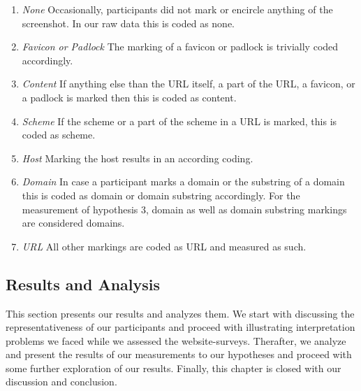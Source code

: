 \begin{enumerate}[leftmargin=0cm]
	\item\textit{None} Occasionally, participants did not mark or encircle anything of the screenshot. In our raw data this is coded as none.
	\item\textit{Favicon or Padlock} The marking of a favicon or padlock is trivially coded accordingly.
	\item\textit{Content} If anything else than the URL itself, a part of the URL, a favicon, or a padlock is marked then this is coded as content.
	\item\textit{Scheme} If the scheme or a part of the scheme in a URL is marked, this is coded as scheme.
	\item\textit{Host} Marking the host results in an according coding.
	\item\textit{Domain} In case a participant marks a domain or the substring of a domain this is coded as domain or domain substring accordingly.
For the measurement of hypothesis 3, domain as well as domain substring markings are considered domains.
	\item\textit{URL} All other markings are coded as URL and measured as such.
\end{enumerate}


\subsection{Results and Analysis}
This section presents our results and analyzes them. 
We start with discussing the representativeness of our participants and proceed with illustrating interpretation problems we faced while we assessed the website-surveys.
Therafter, we analyze and present the results of our measurements to our hypotheses and proceed with some further exploration of our results.
Finally, this chapter is closed with our discussion and conclusion.


